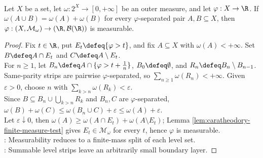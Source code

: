 \begin{proposition} \label{prop:function-separated-outer-measure-measurability} \\
Let $X$ be a set, let $\omega:2^X\to[0,+\infty]$ be an outer measure, and let $\varphi:X\to\R$. If $\omega(A\cup B)=\omega(A)+\omega(B)$ for every $\varphi$-separated pair $A,B\subseteq X$, then $\varphi:(X,\mathcal{M}_\omega)\to(\R,\mathcal{B}(\R))$ is measurable.
\begin{proof} Fix $t\in\R$, put $E_t\defeq\{\varphi>t\}$, and fix $A\subseteq X$ with $\omega(A)<+\infty$. Set $B\defeq A\cap E_t$ and $C\defeq A\setminus E_t$.\\
For $n\geq1$, let $B_n\defeq A\cap\{\varphi>t+\frac{1}{n}\}$, $B_0\defeq\emptyset$, and $R_n\defeq B_n\setminus B_{n-1}$.\\
Same-parity strips are pairwise $\varphi$-separated, so $\sum\limits_{n\geq1}\omega(R_n)<+\infty$. Given $\varepsilon>0$, choose $n$ with $\sum\limits_{k>n}\omega(R_k)<\varepsilon$.\\
Since $B\subseteq B_n\cup\bigcup\limits_{k>n}R_k$ and $B_n,C$ are $\varphi$-separated, $\omega(B)+\omega(C)\leq\omega(B_n\cup C)+\varepsilon\leq\omega(A)+\varepsilon$.\\
Let $\varepsilon\downarrow0$, then $\omega(A)\geq\omega(A\cap E_t)+\omega(A\setminus E_t)$; Lemma \ref{lem:caratheodory-finite-measure-test} gives $E_t\in\mathcal{M}_\omega$ for every $t$, hence $\varphi$ is measurable.\\
: Measurability reduces to a finite-mass split of each level set.\\
: Summable level strips leave an arbitrarily small boundary layer.
\end{proof}
\end{proposition}

